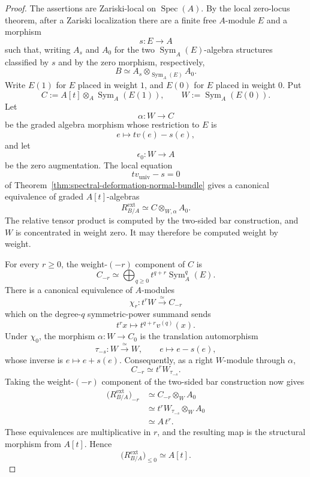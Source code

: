\begin{proof}
The assertions are Zariski-local on \(\operatorname{Spec}(A)\).  By the
local zero-locus theorem, after a Zariski localization there are a finite
free \(A\)-module \(E\) and a morphism
\[
    s:E\longrightarrow A
\]
such that, writing \(A_s\) and \(A_0\) for the two
\(\operatorname{Sym}_A(E)\)-algebra structures classified by \(s\) and by
the zero morphism, respectively,
\[
    B
    \simeq
    A_s\otimes_{\operatorname{Sym}_A(E)}A_0.
\]
Write \(E(1)\) for \(E\) placed in weight \(1\), and \(E(0)\) for \(E\)
placed in weight \(0\).  Put
\[
    C
    :=
    A[t]\otimes_A\operatorname{Sym}_A(E(1)),
    \qquad
    W
    :=
    \operatorname{Sym}_A(E(0)).
\]
Let
\[
    \alpha:W\longrightarrow C
\]
be the graded algebra morphism whose restriction to \(E\) is
\[
    e\longmapsto t v(e)-s(e),
\]
and let
\[
    \epsilon_0:W\longrightarrow A
\]
be the zero augmentation.  The local equation
\[
    t v_{\mathrm{univ}}-s=0
\]
of Theorem~\ref{thm:spectral-deformation-normal-bundle} gives a canonical
equivalence of graded \(A[t]\)-algebras
\[
    R^{\mathrm{ext}}_{B/A}
    \simeq
    C\otimes_{W,\alpha}A_0.
\]
The relative tensor product is computed by the two-sided bar construction,
and \(W\) is concentrated in weight zero.  It may therefore be computed
weight by weight.

For every \(r\geq0\), the weight-\((-r)\) component of \(C\) is
\[
    C_{-r}
    \simeq
    \bigoplus_{q\geq0}
    t^{q+r}\operatorname{Sym}_A^q(E).
\]
There is a canonical equivalence of \(A\)-modules
\[
    \chi_r:
    t^rW
    \xrightarrow{\simeq}
    C_{-r}
\]
which on the degree-\(q\) symmetric-power summand sends
\[
    t^r x
    \longmapsto
    t^{q+r}v^{(q)}(x).
\]
Under \(\chi_0\), the morphism \(\alpha:W\to C_0\) is the translation
automorphism
\[
    \tau_{-s}:W\xrightarrow{\simeq}W,
    \qquad
    e\longmapsto e-s(e),
\]
whose inverse is \(e\mapsto e+s(e)\).  Consequently, as a right
\(W\)-module through \(\alpha\),
\[
    C_{-r}
    \simeq
    t^rW_{\tau_{-s}}.
\]
Taking the weight-\((-r)\) component of the two-sided bar construction now
gives
\[
\begin{aligned}
    \bigl(R^{\mathrm{ext}}_{B/A}\bigr)_{-r}
    &\simeq
    C_{-r}\otimes_WA_0 \\
    &\simeq
    t^rW_{\tau_{-s}}\otimes_WA_0 \\
    &\simeq
    A\,t^r.
\end{aligned}
\]
These equivalences are multiplicative in \(r\), and the resulting map is
the structural morphism from \(A[t]\).  Hence
\[
    \bigl(R^{\mathrm{ext}}_{B/A}\bigr)_{\leq0}
    \simeq
    A[t].
\]


\end{proof}
